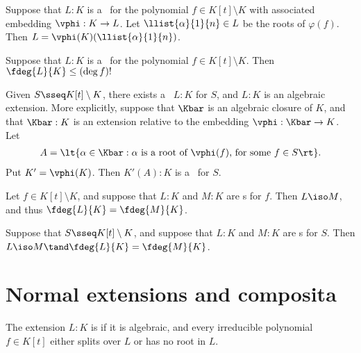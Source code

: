 \documentclass{article}
\begin{document}
  \begin{tproposition}
    Suppose that \( L:K \) is a \sfe~for the polynomial \( f\in K[t]\setminus K \) with associated embedding \( \vphi:K\to L \).
    Let \( \llist{\alpha}{1}{n}\in L \) be the roots of \( \varphi(f) \).
    Then \( L=\vphi(K)(\llist{\alpha}{1}{n}) \).
  \end{tproposition}

  \begin{tproposition}
    Suppose that \( L:K \) is a \sfe~for the polynomial \( f\in K[t]\setminus K \).
    Then \( \fdeg{L}{K}\leq (\deg f)! \)
  \end{tproposition}

  \begin{tproposition}
    Given \( S\sseq K[t]\setminus K \), there exists a \sfe~\( L:K \) for \( S \), and \( L:K \) is an algebraic extension.
    More explicitly, suppose that \( \Kbar \) is an algebraic closure of \( K \), and that \( \Kbar:K \) is an extension relative to the embedding \( \vphi:\Kbar\to K \).
    Let
    \begin{align*}
      A=\lt\{ \alpha\in \Kbar : \alpha\text{ is a root of \( \vphi(f) \), for some } f\in S \rt\}.
    \end{align*}
    Put \( K'=\vphi(K) \).
    Then \( K'(A):K \) is a \sfe~for \( S \).
  \end{tproposition}

  \begin{ttheorem}
    Let \( f\in K[t]\setminus K \), and suppose that \( L:K \) and \( M:K \) are \sfe s for \( f \).
    Then \( L\iso M \), and thus \( \fdeg{L}{K}=\fdeg{M}{K} \).
  \end{ttheorem}

  \begin{ttheorem}
    Suppose that \( S\sseq K[t]\setminus K \), and suppose that \( L:K \) and \( M:K \) are \sfe s for \( S \).
    Then \( L\iso M\tand \fdeg{L}{K}=\fdeg{M}{K} \).
  \end{ttheorem}

\section{Normal extensions and composita}
  \begin{tdefinition}
    The extension \( L:K \) is  if it is algebraic, and every irreducible polynomial \( f\in K[t] \) either splits over \( L \) or has no root in \( L \).
  \end{tdefinition}
\end{document}
